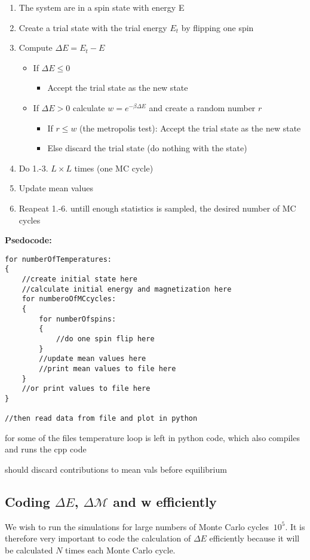 \documentclass[11pt,a4wide]{article}
\begin{document}
\begin{enumerate}
\item The system are in a spin state with energy E
\item Create a trial state with the trial energy $E_t$ by flipping one spin
\item Compute $\Delta E = E_t - E$
\begin{itemize}
\item If $\Delta E \leq 0$
\begin{itemize}
\item Accept the trial state as the new state 
\end{itemize}
\item If $\Delta E >0$ calculate $w = e^{-\beta \Delta E}$ and create a random number $r$
\begin{itemize}
\item If $r\leq w$ (the metropolis test): Accept the trial state as the new state 
\item Else discard the trial state (do nothing with the state)
\end{itemize}
\end{itemize}
\item Do 1.-3. $L\times L$ times (one MC cycle)
\item Update mean values 
\item Reapeat 1.-6. untill enough statistics is sampled, the desired number of MC cycles
\end{enumerate}


\textbf{Psedocode:}
\begin{lstlisting}
for numberOfTemperatures:
{
	//create initial state here
	//calculate initial energy and magnetization here
	for numberoOfMCcycles:
	{
		for numberOfspins:
		{
			//do one spin flip here
		}
		//update mean values here
		//print mean values to file here
	}	
	//or print values to file here
}

//then read data from file and plot in python
\end{lstlisting}


for some of the files temperature loop is left in python code, which also compiles and runs the cpp code

should discard contributions to mean vals before equilibrium


\subsection{Coding $\Delta E$, $\Delta \mathcal{M}$  and w efficiently}
We wish to run the simulations for large numbers of Monte Carlo cycles $~10^5$. It is therefore very important to code the calculation of $\Delta E$ efficiently because it will be calculated $N$ times each Monte Carlo cycle. 
\end{document}
